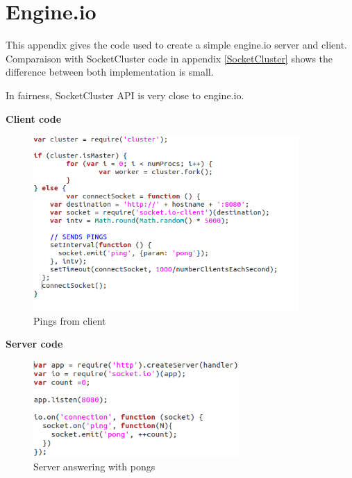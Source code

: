 \chapter{Engine.io}
\label{engine}

This appendix gives the code used to create a simple engine.io server and
client. Comparaison with SocketCluster code in appendix \ref{SocketCluster} 
shows the difference between both implementation is small. 

In fairness, SocketCluster API is very close to engine.io.

\textbf{Client code}

\begin{figure}[H]
	\centering
		\includegraphics[width=0.9\textwidth]{./Figures/engine_client_simplePong.png}
	\caption[Engine.io client code]{Pings from client}
	\label{fig:engine_client_simplePing}
\end{figure}


\textbf{Server code}


\begin{figure}[H]
	\centering
    \includegraphics[width=0.7\textwidth]{./Figures/engine_server_simplePing.png}
	\caption[Engine.io server code]{Server answering with pongs}
	\label{fig:engine_server_simplePong}
\end{figure}

